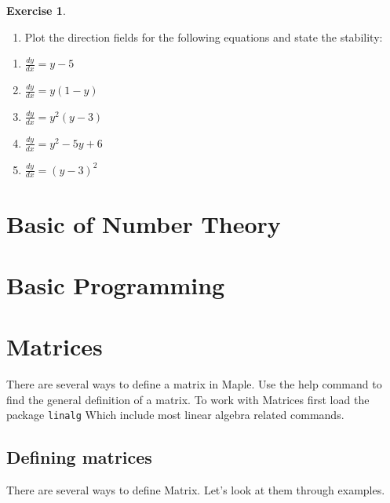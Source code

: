 \documentclass[
]{book}
\providecommand{\tightlist}{%
  \setlength{\itemsep}{0pt}\setlength{\parskip}{0pt}}
\theoremstyle{definition}
\theoremstyle{definition}
\theoremstyle{definition}
\newtheorem{exercise}{Exercise}[chapter]
\theoremstyle{definition}
\theoremstyle{remark}
\begin{document}
\begin{exercise}
\protect\hypertarget{exr:unnamed-chunk-38}{}\label{exr:unnamed-chunk-38}\leavevmode

\begin{enumerate}
\def\labelenumi{\arabic{enumi}.}
\setcounter{enumi}{1}
\tightlist
\item
  Plot the direction fields for the following equations and state the stability:
\end{enumerate}

\begin{enumerate}
\def\labelenumi{(\roman{enumi})}
\tightlist
\item
  \(\frac{dy}{dx} = y - 5\)
\item
  \(\frac{dy}{dx} = y(1 - y)\)
\item
  \(\frac{dy}{dx} = y^2(y - 3)\)
\item
  \(\frac{dy}{dx} = y^2 - 5y + 6\)
\item
  \(\frac{dy}{dx} = (y - 3)^2\)
\end{enumerate}

\end{exercise}

\chapter{Basic of Number Theory}\label{basic-of-number-theory}

\chapter{Basic Programming}\label{basic-programming}

\chapter{Matrices}\label{matrices}

There are several ways to define a matrix in Maple. Use the help command to find the general definition of a matrix. To work with Matrices first load the package \texttt{linalg} Which include most linear algebra related commands.

\section{Defining matrices}\label{defining-matrices}

There are several ways to define Matrix. Let's look at them through examples.
\end{document}
